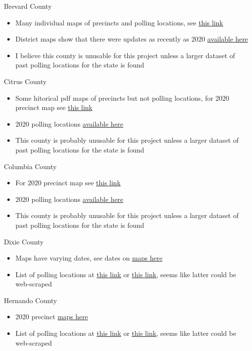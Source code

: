 \documentclass[12pt]{article}
\begin{document}
Brevard County
\begin{itemize}
  \item Many individual maps of precincts and polling locations, see \href{https://www.votebrevard.com/m/Maps/Precinct-Maps-Copy}{this link}
  \item District maps show that there were updates as recently as 2020 \href{https://www.votebrevard.com/m/Maps/District-Maps}{available here}
  \item I believe this county is unusable for this project unless a larger dataset of past polling locations for the state is found
\end{itemize}
Citrus County
\begin{itemize}
  \item Some hitorical pdf maps of precincts but not polling locations, for 2020 precinct map see \href{https://www.votecitrus.com/Portals/Citrus/Pct%20map%20February%20Layout_2.pdf?ver=2020-04-28-200823-073}{this link}
  \item 2020 polling locations \href{https://www.voterfocus.com/PrecinctFinder/precinctDirectory?county=FL-CIT}{available here}
  \item This county is probably unusable for this project unless a larger dataset of past polling locations for the state is found
\end{itemize}
Columbia County
\begin{itemize}
  \item For 2020 precinct map see \href{https://www.votecolumbia.com/Portals/Columbia/Documents/SOE_Prec2019.pdf?ver=2020-06-29-135723-083}{this link}
  \item 2020 polling locations \href{https://www.votecolumbia.com/Voter-Info/Precincts-and-Maps}{available here}
  \item This county is probably unusable for this project unless a larger dataset of past polling locations for the state is found
\end{itemize}
Dixie County
\begin{itemize}
  \item Maps have varying dates, see dates on \href{https://www.duvalelections.com/Voter-Information/Maps/Precinct-Maps}{maps here}
  \item List of polling locations at \href{https://www.duvalelections.com/Election-Information/2015-Duval-General-Polling-Locations}{this link} or \href{https://www.voterfocus.com/PrecinctFinder/precinctDirectory?county=FL-DUV}{this link},  seems like latter could be web-scraped
\end{itemize}
Hernando County
\begin{itemize}
  \item 2020 precinct \href{https://www.hernandovotes.com/Portals/Hernando/Voting%20Precincts062520.pdf?ver=2020-06-26-132804-290}{maps here}
  \item List of polling locations at \href{https://www.hernandovotes.com/Portals/Hernando/Documents/Polling%20Locations.pdf}{this link} or \href{https://www.voterfocus.com/PrecinctFinder/precinctDirectory?county=FL-HER}{this link},  seems like latter could be web-scraped
\end{itemize}
\end{document}
